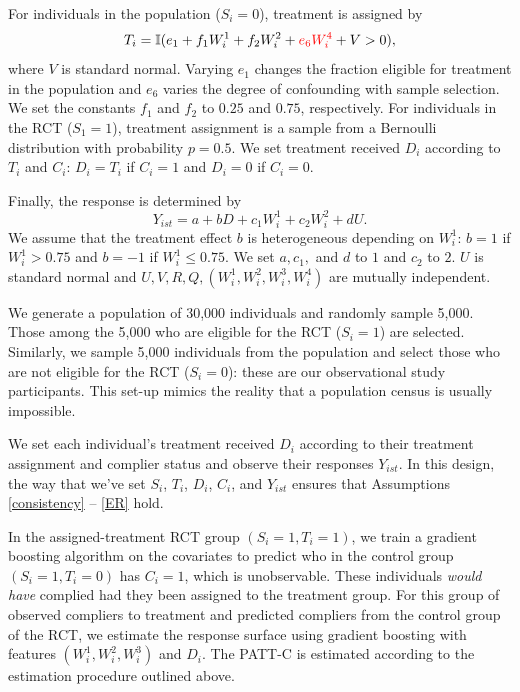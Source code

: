\documentclass[hidelinks,12pt]{article}
\newcommand{\ind}{\mathbb{I}} %
\begin{document}
{For individuals in the population ($S_i=0$), treatment is assigned by
 \vskip 0.2in
  $$T_i = \ind(e_1 + f_1W^{1}_i + f_2W^{2}_i + {\color{red}e_6W^{4}_i} + V > 0),$$
  \vskip 0.2in
\noindent
where $V$ is standard normal. Varying $e_1$ changes the fraction eligible for treatment in the population and {\color{red}$e_6$ varies the degree of confounding with sample selection.} We set the constants $f_1$ and $f_2$ to $0.25$ and $0.75$, respectively. For individuals in the RCT ($S_1=1$), treatment assignment is a sample from a Bernoulli distribution with probability $p=0.5$.
We set treatment received $D_i$ according to $T_i$ and $C_i$: $D_i = T_i$ if $C_i=1$ and $D_i = 0$ if $C_i=0$.

Finally, the response is determined by 
\vskip 0.2in
$$Y_{ist} = a + bD + c_1W^{1}_i + c_2W^{2}_i + dU.$$
\vskip 0.2in
We assume that the treatment effect $b$ is heterogeneous depending on $W^{1}_i$: $b = 1$ if $W^{1}_i > 0.75$ and $b=-1$ if $W^{1}_i \leq 0.75$.  We set $a, c_1,$ and $d$ to $1$ and $c_2$ to $2$. $U$ is standard normal and $U, V, R, Q, (W^{1}_i, W^{2}_i, W^{3}_i, W^{4}_i)$ are mutually independent.
 
We generate a population of 30,000 individuals and randomly sample 5,000. Those among the 5,000 who are eligible for the RCT ($S_i=1$) are selected. Similarly, we sample 5,000 individuals from the population and select those who are not eligible for the RCT ($S_i=0$): these are our observational study participants. This set-up mimics the reality that a population census is usually impossible.

We set each individual's treatment received $D_i$ according to their treatment assignment and complier status and observe their responses $Y_{ist}$. In this design, the way that we've set $S_i$, $T_i$, $D_i$, $C_i$, and $Y_{ist}$ ensures that Assumptions \ref{consistency} -- \ref{ER} hold.

{\color{red}
In the assigned-treatment RCT group $(S_i = 1, T_i = 1)$, we train a gradient boosting algorithm on the covariates to predict who in the control group $(S_i = 1, T_i = 0)$ has $C_i=1$, which is unobservable.} These individuals \textit{would have} complied had they been assigned to the treatment group. For this group of observed compliers to treatment and predicted compliers from the control group of the RCT, we estimate the response surface {\color{red}using gradient boosting} with features $(W^{1}_i, W^{2}_i, W^{3}_i)$ and $D_i$. The PATT-C is estimated according to the estimation procedure outlined above.

}
\end{document}
